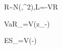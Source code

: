 R\sim\mathcal N(\mu,\sigma^2),\qquad L=-VR

VaR_\alpha=V(z_\alpha\sigma-\mu)

ES_\alpha=V\left(\sigma{}-\mu\right)
